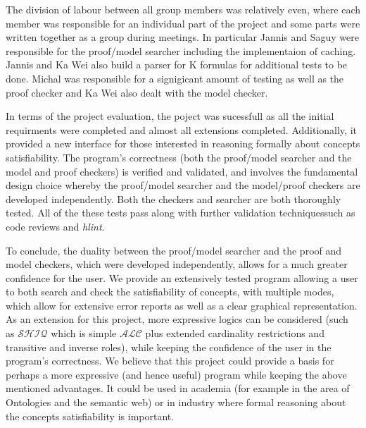 
The division of labour between all group members was relatively even, where each member was responsible for an individual part of the project and some parts were written together as a group during meetings. In particular Jannis and Saguy were responsible for the proof/model searcher including the implementaion of caching. Jannis and Ka Wei also build a parser for K formulas for additional tests to be done. Michal was responsible for a signigicant amount of testing as well as the proof checker and Ka Wei also dealt with the model checker. 

In terms of the project evaluation, the poject was sucessfull as all the initial requirments were completed and almost all extensions completed. Additionally, it provided a new interface for those interested in reasoning formally about concepts satisfiability. The program's correctness (both the proof/model searcher and the model and proof checkers) is verified and validated, and involves the fundamental design choice whereby the proof/model searcher and the model/proof checkers are developed independently. Both the checkers and searcher are both thoroughly tested. All of the these tests pass along with further validation techniquessuch as code reviews and \emph{hlint}.

To conclude, the duality between the proof/model searcher and the proof and model checkers, which were developed independently, allows for a much greater confidence for the user. We provide an extensively tested program allowing a user to both search and check the satisfiability of concepts, with multiple modes, which allow for extensive error reports as well as a clear graphical representation. As an extension for this project, more expressive logics can be considered (such as $\mathcal{SHIQ}$ which is simple $\mathcal{ALC}$ plus extended cardinality restrictions and transitive and inverse roles), while keeping the confidence of the user in the program's correctness. We believe that this project could provide a basis for perhaps a more expressive (and hence useful) program while keeping the above mentioned advantages. It could be used in academia (for example in the area of Ontologies and the semantic web) or in industry where formal reasoning about the concepts satisfiability is important. 


